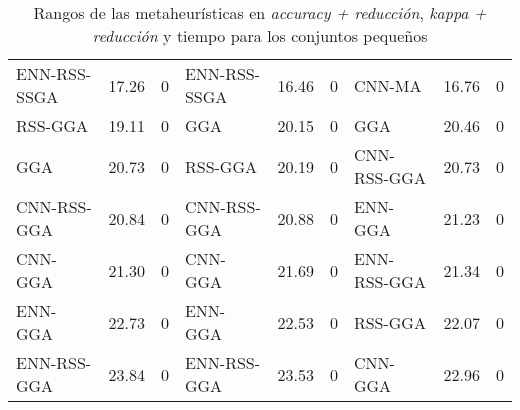 \begin{table}[]
\begin{adjustbox}{max width =\textwidth}
\begin{tabular}{l c c|l c c|l c c}
ENN-RSS-SSGA & 17.26 & 0 & ENN-RSS-SSGA & 16.46 & 0  & CNN-MA       & 16.76 & 0 \\
RSS-GGA      & 19.11 & 0 & GGA          & 20.15 & 0  & GGA          & 20.46 & 0 \\
GGA          & 20.73 & 0 & RSS-GGA      & 20.19 & 0  & CNN-RSS-GGA  & 20.73 & 0 \\
CNN-RSS-GGA  & 20.84 & 0 & CNN-RSS-GGA  & 20.88 & 0  & ENN-GGA      & 21.23 & 0 \\
CNN-GGA      & 21.30 & 0 & CNN-GGA      & 21.69 & 0  & ENN-RSS-GGA  & 21.34 & 0 \\
ENN-GGA      & 22.73 & 0 & ENN-GGA      & 22.53 & 0  & RSS-GGA      & 22.07 & 0 \\
ENN-RSS-GGA  & 23.84 & 0 & ENN-RSS-GGA  & 23.53 & 0  & CNN-GGA      & 22.96 & 0 \\

\hline
\end{tabular}
\end{adjustbox}
\caption{Rangos de las metaheurísticas en \emph{accuracy + reducción}, \emph{kappa + reducción} y tiempo para los conjuntos pequeños}
\label{table-inits-rank}
\end{table} 


